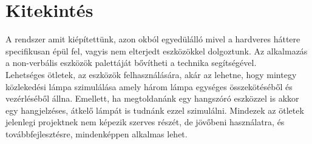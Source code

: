 \documentclass[tocnopagenum]{thesis-ekf}
\theoremstyle{definition}
\theoremstyle{remark}
\begin{document}
	\chapter*{Kitekintés}
	A rendszer amit kiépítettünk, azon okból egyedülálló mivel a hardveres háttere specifikusan épül fel, vagyis nem elterjedt eszközökkel dolgoztunk. Az alkalmazás a non-verbális eszközök palettáját bővítheti a technika segítségével. 
	\\
	Lehetséges ötletek, az eszközök felhasználására, akár az lehetne, hogy mintegy közlekedési lámpa szimulálása amely három lámpa egységes összekötéséből és vezérléséből állna. Emellett, ha megtoldanánk egy hangszóró eszközzel is akkor egy hangjelzéses, átkelő lámpát is tudnánk ezzel szimulálni.
	Mindezek az ötletek jelenlegi projektnek nem képezik szerves részét, de jövőbeni használatra, és továbbfejlesztésre, mindenképpen alkalmas lehet.
	
	

	

\end{document}
